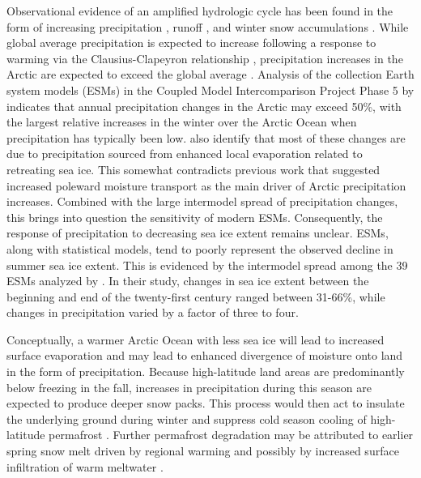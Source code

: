 Observational evidence of an amplified hydrologic cycle \citep{Stocker_2005} has been found in the form of increasing precipitation \citep{Rawlins_2006}, runoff \citep{Peterson_2002}, and winter snow accumulations \citep{Kohler_2006,Bulygina_2009}.
While global average precipitation is expected to increase following a response to warming via the Clausius-Clapeyron relationship \citep[e.g. ][]{Held_2006,Stephens_2008,Byrne_2015}, precipitation increases in the Arctic are expected to exceed the global average \citep{Stocker_2005}.
Analysis of the collection Earth system models (ESMs) in the Coupled Model Intercomparison Project Phase 5 \citep[CMIP5; ][]{Taylor_2012} by \citet{Bintanja_2014} indicates that annual precipitation changes in the Arctic may exceed 50\%, with the largest relative increases in the winter over the Arctic Ocean when precipitation has typically been low.
\citet{Bintanja_2014} also identify that most of these changes are due to precipitation sourced from enhanced local evaporation related to retreating sea ice.
This somewhat contradicts previous work that suggested increased poleward moisture transport as the main driver of Arctic precipitation increases. Combined with the large intermodel spread of precipitation changes, this brings into question the sensitivity of modern ESMs. %
Consequently, the response of precipitation to decreasing sea ice extent remains unclear.
ESMs, along with statistical models, tend to poorly represent the observed decline in summer sea ice extent.
This is evidenced by the intermodel spread among the 39 ESMs analyzed by \citet{Bintanja_2014}.
In their study, changes in sea ice extent between the beginning and end of the twenty-first century ranged between 31-66\%, while changes in precipitation varied by a factor of three to four. %

Conceptually, a warmer Arctic Ocean with less sea ice will lead to increased surface evaporation and may lead to enhanced divergence of moisture onto land in the form of precipitation.
Because high-latitude land areas are predominantly below freezing in the fall, increases in precipitation during this season are expected to produce deeper snow packs.
This process would then act to insulate the underlying ground during winter and suppress cold season cooling of high-latitude permafrost \citep{Osterkamp_1999,Zhang_2005,Lawrence_2010}.
Further permafrost degradation may be attributed to earlier spring snow melt driven by regional warming and possibly by increased surface infiltration of warm meltwater \citep{Lawrence_2010}.


